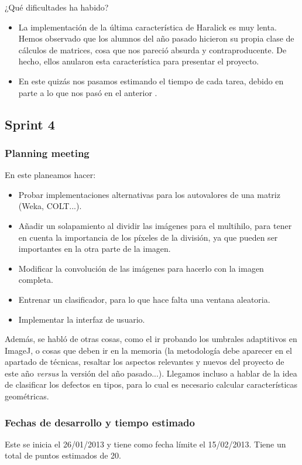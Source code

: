 ¿Qué dificultades ha habido?
\begin{itemize}
 \item La implementación de la última característica de Haralick es muy lenta. Hemos observado que los alumnos del año pasado hicieron su propia clase de cálculos de matrices, cosa que nos pareció absurda y contraproducente. De hecho, ellos anularon esta característica para presentar el proyecto.
 \item En este \sprint{} quizás nos pasamos estimando el tiempo de cada tarea, debido en parte a lo que nos pasó en el anterior \sprint{}.
\end{itemize}


\subsection{Sprint 4}
\subsubsection*{Planning meeting}
En este \sprint{} planeamos hacer:

\begin{itemize}
\item Probar implementaciones alternativas para los autovalores de una matriz (Weka, COLT...).
\item Añadir un solapamiento al dividir las imágenes para el multihilo, para tener en cuenta la importancia de los píxeles de la división, ya que pueden ser importantes en la otra parte de la imagen.
\item Modificar la convolución de las imágenes para hacerlo con la imagen completa.
\item Entrenar un clasificador, para lo que hace falta una ventana aleatoria.
\item Implementar la interfaz de usuario.
\end{itemize}

Además, se habló de otras cosas, como el ir probando los umbrales adaptitivos en ImageJ, o cosas que deben ir en la memoria (la metodología debe aparecer en el apartado de técnicas, resaltar los aspectos relevantes y nuevos del proyecto de este año \textit{versus} la versión del año pasado...). Llegamos incluso a hablar de la idea de clasificar los defectos en tipos, para lo cual es necesario calcular características geométricas.

\subsubsection*{Fechas de desarrollo y tiempo estimado}
Este \sprint{} se inicia el 26/01/2013 y tiene como fecha límite el 15/02/2013. Tiene un total de puntos estimados de 20.


